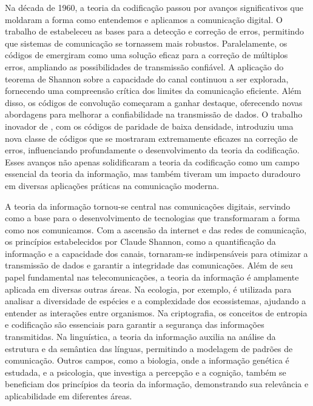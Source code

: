 Na década de 1960, a teoria da codificação passou por avanços significativos
que moldaram a forma como entendemos e aplicamos a comunicação digital. O
trabalho de \textcite{hamming1950} estabeleceu as bases para a detecção e correção
de erros, permitindo que sistemas de comunicação se tornassem mais robustos.
Paralelamente, os códigos de \textcite{golay1949} emergiram como uma solução
eficaz para a correção de múltiplos erros, ampliando as possibilidades de
transmissão confiável. A aplicação do teorema de Shannon sobre a capacidade do
canal continuou a ser explorada, fornecendo uma compreensão crítica dos limites
da comunicação eficiente. Além disso, os códigos de convolução começaram a
ganhar destaque, oferecendo novas abordagens para melhorar a confiabilidade na
transmissão de dados. O trabalho inovador de \textcite{gallager1962}, com os
códigos de paridade de baixa densidade, introduziu uma nova classe de códigos
que se mostraram extremamente eficazes na correção de erros, influenciando
profundamente o desenvolvimento da teoria da codificação. Esses avanços não
apenas solidificaram a teoria da codificação como um campo essencial da teoria
da informação, mas também tiveram um impacto duradouro em diversas aplicações
práticas na comunicação moderna.

A teoria da informação tornou-se central nas comunicações digitais, servindo
como a base para o desenvolvimento de tecnologias que transformaram a forma
como nos comunicamos. Com a ascensão da internet e das redes de comunicação, os
princípios estabelecidos por Claude Shannon, como a quantificação da informação
e a capacidade dos canais, tornaram-se indispensáveis para otimizar a
transmissão de dados e garantir a integridade das comunicações.  Além de seu
papel fundamental nas telecomunicações, a teoria da informação é amplamente
aplicada em diversas outras áreas. Na ecologia, por exemplo, é utilizada para
analisar a diversidade de espécies e a complexidade dos ecossistemas, ajudando
a entender as interações entre organismos. Na criptografia, os conceitos de
entropia e codificação são essenciais para garantir a segurança das informações
transmitidas. Na linguística, a teoria da informação auxilia na análise da
estrutura e da semântica das línguas, permitindo a modelagem de padrões de
comunicação. Outros campos, como a biologia, onde a informação genética é
estudada, e a psicologia, que investiga a percepção e a cognição, também se
beneficiam dos princípios da teoria da informação, demonstrando sua relevância
e aplicabilidade em diferentes áreas.
